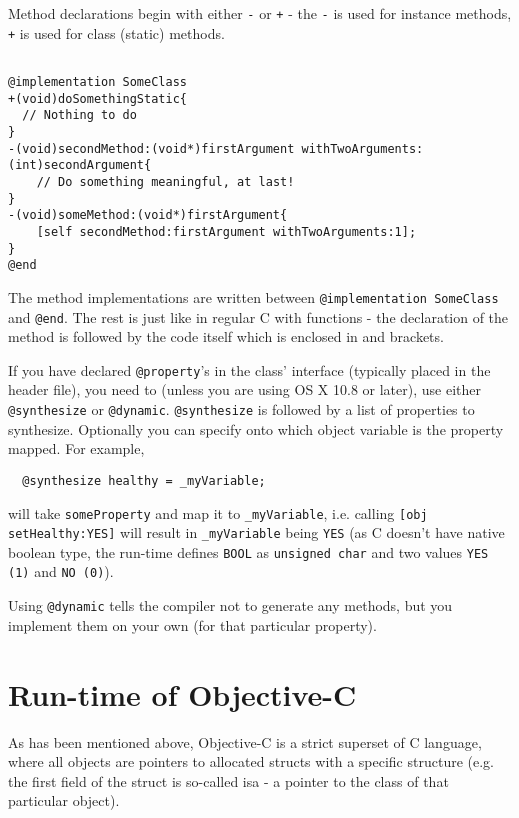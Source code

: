 \documentclass[a4paper, 11pt, fleqn]{book}
\begin{document}
Method declarations begin with either \verb=-= or \verb=+= - the \verb=-= is used for instance methods, \verb=+= is used for class (static) methods.


\begin{verbatim}

@implementation SomeClass
+(void)doSomethingStatic{
  // Nothing to do
}
-(void)secondMethod:(void*)firstArgument withTwoArguments:(int)secondArgument{
    // Do something meaningful, at last!
}
-(void)someMethod:(void*)firstArgument{
    [self secondMethod:firstArgument withTwoArguments:1];
}
@end

\end{verbatim}

The method implementations are written between \verb=@implementation SomeClass= and \verb=@end=. The rest is just like in regular C with functions - the declaration of the method is followed by the code itself which is enclosed in { and } brackets.

If you have declared \verb=@property='s in the class' interface (typically placed in the header file), you need to (unless you are using OS X 10.8 or later), use either \verb=@synthesize= or \verb=@dynamic=. \verb=@synthesize= is followed by a list of properties to synthesize. Optionally you can specify onto which object variable is the property mapped. For example,

\begin{verbatim}
  @synthesize healthy = _myVariable;
\end{verbatim}

will take \verb=someProperty= and map it to \verb=_myVariable=, i.e. calling \verb=[obj setHealthy:YES]= will result in \verb=_myVariable= being \verb=YES= (as C doesn't have native boolean type, the run-time defines \verb=BOOL= as \verb=unsigned char= and two values \verb=YES (1)= and \verb=NO (0)=).

Using \verb=@dynamic= tells the compiler not to generate any methods, but you implement them on your own (for that particular property).


\section{Run-time of Objective-C}

As has been mentioned above, Objective-C is a strict superset of C language, where all objects are pointers to allocated structs with a specific structure (e.g. the first field of the struct is so-called isa - a pointer to the class of that particular object).
  
\end{document}

